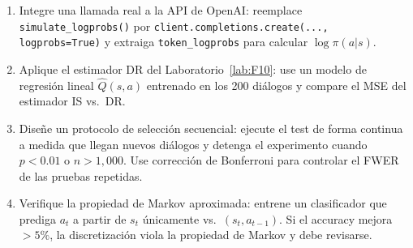 \begin{enumerate}
    \item Integre una llamada real a la API de OpenAI:
          reemplace \texttt{simulate\_logprobs()} por
          \texttt{client.completions.create(..., logprobs=True)} y
          extraiga \texttt{token\_logprobs} para calcular $\log\pi(a|s)$.
    \item Aplique el estimador DR del Laboratorio~\ref{lab:F10}: use un modelo
          de regresión lineal $\hat{Q}(s,a)$ entrenado en los 200 diálogos y
          compare el MSE del estimador IS vs.\ DR.
    \item Diseñe un protocolo de selección secuencial: ejecute el test de
          forma continua a medida que llegan nuevos diálogos y detenga el
          experimento cuando $p < 0.01$ o $n > 1{,}000$. Use corrección
          de Bonferroni para controlar el FWER de las pruebas repetidas.
    \item Verifique la propiedad de Markov aproximada: entrene un clasificador
          que prediga $a_t$ a partir de $s_t$ únicamente vs.\ $(s_t, a_{t-1})$.
          Si el accuracy mejora $> 5\%$, la discretización viola la propiedad
          de Markov y debe revisarse.
\end{enumerate}
